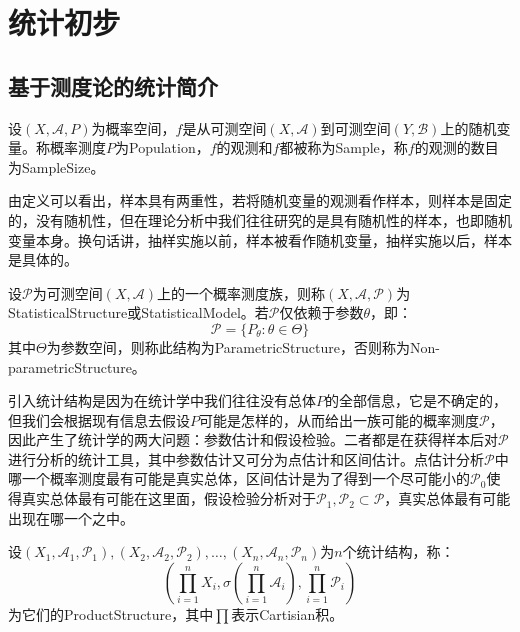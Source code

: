 \chapter{统计初步}

\section{基于测度论的统计简介}
\begin{definition}
	设$(X,\mathscr{A},P)$为概率空间，$f$是从可测空间$(X,\mathscr{A})$到可测空间$(Y,\mathscr{B})$上的随机变量。称概率测度$P$为\gls{Population}，$f$的观测和$f$都被称为\gls{Sample}，称$f$的观测的数目为\gls{SampleSize}。
\end{definition}
\begin{note}
	由定义可以看出，样本具有两重性，若将随机变量的观测看作样本，则样本是固定的，没有随机性，但在理论分析中我们往往研究的是具有随机性的样本，也即随机变量本身。换句话讲，抽样实施以前，样本被看作随机变量，抽样实施以后，样本是具体的。
\end{note}
\begin{definition}
	设$\mathscr{P}$为可测空间$(X,\mathscr{A})$上的一个概率测度族，则称$(X,\mathscr{A},\mathscr{P})$为\gls{StatisticalStructure}或\gls{StatisticalModel}。若$\mathscr{P}$仅依赖于参数$\theta$，即：
	\begin{equation*}
		\mathscr{P}=\{P_{\theta}:\theta\in\Theta\}
	\end{equation*}
	其中$\Theta$为参数空间，则称此结构为\gls{ParametricStructure}，否则称为\gls{Non-parametricStructure}。
\end{definition}
\begin{note}
	引入统计结构是因为在统计学中我们往往没有总体$P$的全部信息，它是不确定的，但我们会根据现有信息去假设$P$可能是怎样的，从而给出一族可能的概率测度$\mathscr{P}$，因此产生了统计学的两大问题：参数估计和假设检验。二者都是在获得样本后对$\mathscr{P}$进行分析的统计工具，其中参数估计又可分为点估计和区间估计。点估计分析$\mathscr{P}$中哪一个概率测度最有可能是真实总体，区间估计是为了得到一个尽可能小的$\mathscr{P}_0$使得真实总体最有可能在这里面，假设检验分析对于$\mathscr{P}_1,\mathscr{P}_2\subset\mathscr{P}$，真实总体最有可能出现在哪一个之中。
\end{note}
\begin{definition}
	设$(X_1,\mathscr{A}_1,\mathscr{P}_1),(X_2,\mathscr{A}_2,\mathscr{P}_2),\dots,(X_n,\mathscr{A}_n,\mathscr{P}_n)$为$n$个统计结构，称：
	\begin{equation*}
		\left(\prod_{i=1}^nX_i,\sigma\left(\prod_{i=1}^n\mathscr{A}_i\right),\prod_{i=1}^n\mathscr{P}_i\right)
	\end{equation*}
	为它们的\gls{ProductStructure}，其中$\prod$表示Cartisian积。
\end{definition}
